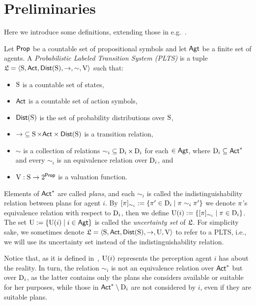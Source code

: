 \section{Preliminaries}
\label{sec:preliminaries}

Here we introduce some definitions, extending those in e.g.~\cite{AFSVQ21,AFSVQ23}.


\begin{definition}\label{def:plts}
    Let $\PROP$ be a countable set of propositional symbols and let $\AGT$ be a finite set of agents.  
    A \emph{Probabilistic Labeled Transition System (PLTS)}  is a tuple
    $\model=\tup{\S,\ACT,\dist(\S),\ra,\sim,\V}$ such that:
    \begin{itemize}
        \item $\S$ is a countable set of states,
        \item $\ACT$ is a countable set of action symbols,
        \item $\dist(\S)$ is the set of probability distributions over $\S$,
        \item ${\ra} \subseteq \S \times \ACT \times \dist(\S)$ is a transition relation,
        \item ${\sim}$ is a collection of relations ${\sim_i}\subseteq \DS{i}\times \DS{i}$ for each $\in\AGT$, where $\DS{i}\subseteq\ACT^*$ and every $\sim_i$ is an equivalence relation over $\DS{i}$, and 
        \item $\V: \S \ra 2^\PROP$ is a valuation function.
    \end{itemize}
    Elements of $\ACT^*$ are called \emph{plans}, and each $\sim_i$ is called the indistinguishability relation between plans for agent $i$. 
    By $[\plan]_{\sim_i}:=\set{\plan' \in \DS{i} \mid \plan \sim_i \plan'}$ we denote $\plan$'s equivalence relation with respect to $\DS{i}$, then we define $\Unc(i) := \set{[\plan]_{\sim_i} \mid \plan\in\DS{i}}$. The set $\Unc:=\set{\Unc(i) \mid i\in\AGT}$ is called the \emph{uncertainty set} of $\model$. For simplicity sake, we sometimes denote $\model=\tup{\S,\ACT,\dist(\S),\ra,\Unc,\V}$ to refer to a PLTS, i.e., we will use its uncertainty set instead of the indistinguishability relation.
\end{definition}

Notice that, as it is defined in~\cite{AFSVQ21,AFSVQ23}, $\Unc(i)$ represents the perception agent $i$ has about the reality. In turn, the relation $\sim_i$ is not an equivalence relation over $\ACT^*$ but over $\DS{i}$, as the latter contains only the plans she considers available or suitable for her purposes, while those in $\ACT^*\setminus\DS{i}$ are not considered by $i$, even if they are suitable plans. 


